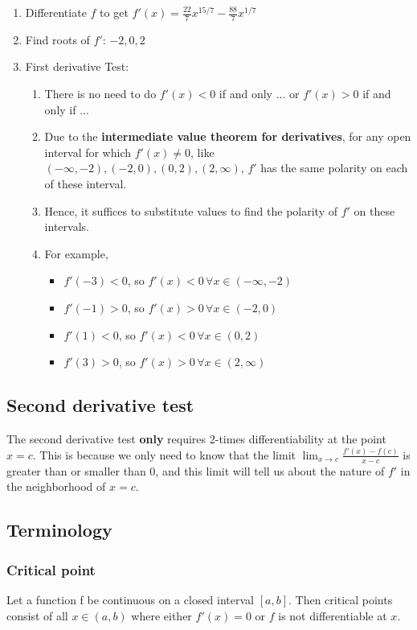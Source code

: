 \documentclass{article}
\begin{document}
\begin{enumerate}
	\item Differentiate $f$ to get $f'(x)=\frac{22}{7}x^{15/7}-\frac{88}{7}x^{1/7}$
	\item Find roots of $f'$: $-2, 0, 2$
	\item First derivative Test:
	\begin{enumerate}
		\item There is no need to do $f'(x)<0$ if and only ... or $f'(x)>0$ if and only if ...
		\item Due to the \textbf{intermediate value theorem for derivatives}, for any open interval for which $f'(x)\neq 0$, like $(-\infty, -2), (-2, 0), (0, 2), (2, \infty)$, $f'$ has the same polarity on each of these interval.
		\item Hence, it suffices to substitute values to find the polarity of $f'$ on these intervals.
		\item For example,
		\begin{itemize}
			\item $f'(-3) < 0$, so $f'(x)<0\, \forall x\in(-\infty, -2)$
			\item $f'(-1) > 0$, so $f'(x)>0\, \forall x\in(-2, 0)$
			\item $f'(1) < 0$, so $f'(x)<0\, \forall x\in(0, 2)$
			\item $f'(3) > 0$, so $f'(x)>0\, \forall x\in(2, \infty)$
		\end{itemize}
	\end{enumerate}
\end{enumerate}


\subsection{Second derivative test}
The second derivative test \textbf{only} requires 2-times differentiability at the point $x=c$. This is because we only need to know that the limit $\lim_{x\rightarrow c}\frac{f'(x)-f(c)}{x-c}$ is greater than or smaller than 0, and this limit will tell us about the nature of $f'$ in the neighborhood of $x=c$. 

\subsection{Terminology}
\subsubsection{Critical point}
Let a function f be continuous on a closed interval $[a,b]$. Then critical points consist of all $x\in (a,b)$ where either $f'(x)=0$ or $f$ is not differentiable at $x$.
\end{document}

